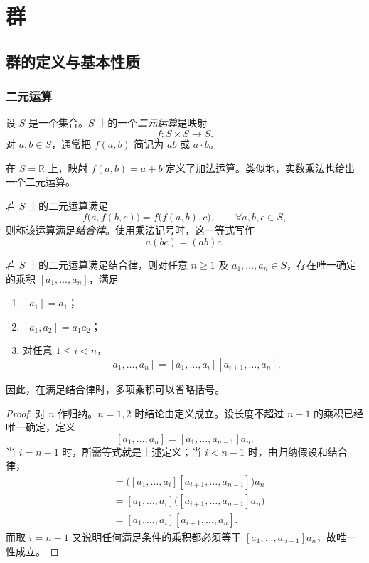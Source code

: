 \chapter{群}

\section{群的定义与基本性质}

\subsection{二元运算}

\begin{definition}[二元运算]
设 $S$ 是一个集合。$S$ 上的一个\emph{二元运算}是映射
\[
  f\colon S\times S\longrightarrow S.
\]
对 $a,b\in S$，通常把 $f(a,b)$ 简记为 $ab$ 或 $a\cdot b$。
\end{definition}

\begin{example}
在 $S=\mathbb R$ 上，映射 $f(a,b)=a+b$ 定义了加法运算。类似地，实数乘法也给出一个二元运算。
\end{example}

\begin{definition}[结合律]
若 $S$ 上的二元运算满足
\[
  f\bigl(a,f(b,c)\bigr)=f\bigl(f(a,b),c\bigr),
  \qquad \forall a,b,c\in S,
\]
则称该运算满足\emph{结合律}。使用乘法记号时，这一等式写作
\[
  a(bc)=(ab)c.
\]
\end{definition}

\begin{theorem}[结合运算下乘积的唯一性]
若 $S$ 上的二元运算满足结合律，则对任意 $n\geq 1$ 及 $a_1,\dots,a_n\in S$，存在唯一确定的乘积
$[a_1,\dots,a_n]$，满足
\begin{enumerate}
  \item $[a_1]=a_1$；
  \item $[a_1,a_2]=a_1a_2$；
  \item 对任意 $1\leq i<n$，
  \[
    [a_1,\dots,a_n]
    =[a_1,\dots,a_i][a_{i+1},\dots,a_n].
  \]
\end{enumerate}
因此，在满足结合律时，多项乘积可以省略括号。
\end{theorem}

\begin{proof}
对 $n$ 作归纳。$n=1,2$ 时结论由定义成立。设长度不超过 $n-1$ 的乘积已经唯一确定，定义
\[
  [a_1,\dots,a_n]=[a_1,\dots,a_{n-1}]a_n.
\]
当 $i=n-1$ 时，所需等式就是上述定义；当 $i<n-1$ 时，由归纳假设和结合律，
\begin{align*}
  [a_1,\dots,a_n]
  &=\bigl([a_1,\dots,a_i][a_{i+1},\dots,a_{n-1}]\bigr)a_n\\
  &=[a_1,\dots,a_i]
    \bigl([a_{i+1},\dots,a_{n-1}]a_n\bigr)\\
  &=[a_1,\dots,a_i][a_{i+1},\dots,a_n].
\end{align*}
而取 $i=n-1$ 又说明任何满足条件的乘积都必须等于
$[a_1,\dots,a_{n-1}]a_n$，故唯一性成立。
\end{proof}

